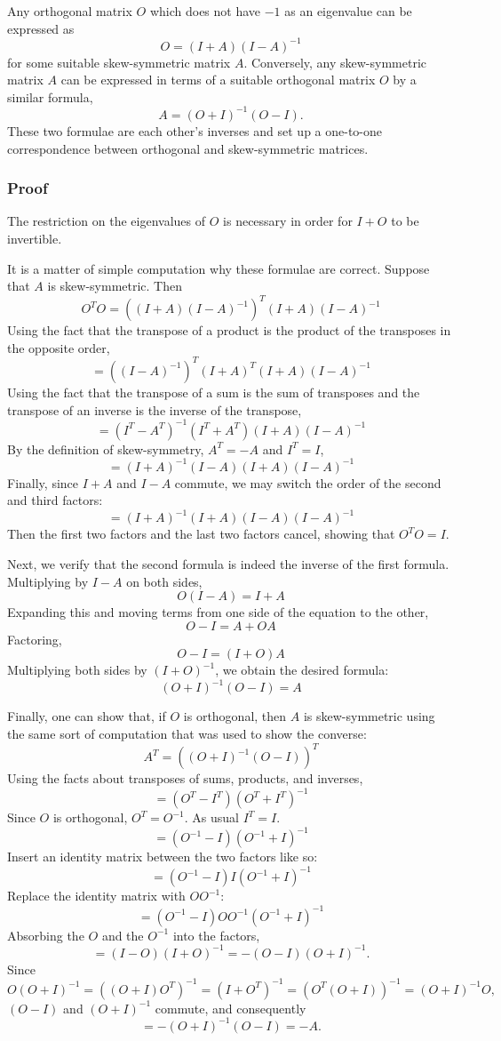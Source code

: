 \documentclass[12pt]{article}
\begin{document}

Any orthogonal matrix $O$ which does not have $-1$ as an eigenvalue can be expressed as 
 $$O = (I + A) (I - A)^{-1}$$
 for some suitable skew-symmetric matrix $A$.  Conversely, any skew-symmetric matrix $A$ can be expressed in terms of a suitable orthogonal matrix $O$ by a similar formula, 
 $$A = (O + I)^{-1} (O - I).$$
These two formulae are each other's inverses and set up a one-to-one correspondence between orthogonal and skew-symmetric matrices.

\subsubsection{Proof}

The restriction on the eigenvalues of $O$ is necessary in order for $I + O$ to be invertible.

It is a matter of simple computation why these formulae are correct.  Suppose that $A$ is skew-symmetric.  Then
 $$O^T O = \left( (I + A) (I - A)^{-1} \right)^T (I + A) (I - A)^{-1}$$
Using the fact that the transpose of a product is the product of the transposes in the opposite order,
 $$= ((I - A)^{-1})^T (I + A)^T (I + A) (I - A)^{-1}$$
Using the fact that the transpose of a sum is the sum of transposes and the transpose of an inverse is the inverse of the transpose,
 $$= (I^T - A^T)^{-1} (I^T + A^T) (I + A) (I - A)^{-1}$$
By the definition of skew-symmetry, $A^T = -A$ and $I^T = I$,
 $$= (I + A)^{-1} (I - A) (I + A) (I - A)^{-1}$$
Finally, since $I + A$ and $I - A$ commute, we may switch the order of the second and third factors:
 $$= (I + A)^{-1} (I + A) (I - A) (I - A)^{-1}$$
Then the first two factors and the last two factors cancel, showing that $O^T O = I$.

Next, we verify that the second formula is indeed the inverse of the first formula.  Multiplying by $I - A$ on both sides,
 $$O (I - A) = I + A$$
Expanding this and moving terms from one side of the equation to the other,
 $$O - I = A + OA$$
Factoring,
 $$O - I = (I + O) A$$
Multiplying both sides by $(I + O)^{-1}$, we obtain the desired formula:
 $$(O + I)^{-1} (O - I) = A$$

Finally, one can show that, if $O$ is orthogonal, then $A$ is skew-symmetric using the same sort of computation that was used to show the converse:
 $$A^T = \left( (O + I)^{-1} (O - I) \right)^T$$
Using the facts about transposes of sums, products, and inverses,
 $$ = (O^T - I^T) (O^T + I^T)^{-1}$$
Since $O$ is orthogonal, $O^T = O^{-1}$.  As usual $I^T = I$.
 $$ = (O^{-1} - I) (O^{-1} + I)^{-1}$$
Insert an identity matrix between the two factors like so:
 $$ = (O^{-1} - I) I (O^{-1} + I)^{-1}$$
Replace the identity matrix with $O O^{-1}$:
 $$ = (O^{-1} - I) O O^{-1} (O^{-1} + I)^{-1}$$
Absorbing the $O$ and the $O^{-1}$ into the factors,
 $$ = (I - O) (I + O)^{-1} = - (O - I ) (O + I)^{-1}.$$
Since 
 $$O(O+I)^{-1}=((O+I)O^T)^{-1}=(I+O^T)^{-1}=(O^T(O+I))^{-1}=(O+I)^{-1}O,$$
$(O-I)$ and $(O+I)^{-1}$ commute, and consequently
 $$ = - (O+I)^{-1}(O-I)= - A.$$ 
\end{document}
